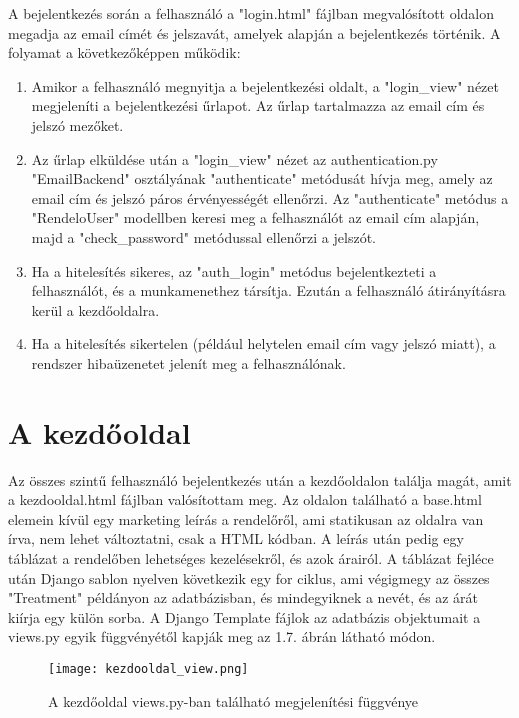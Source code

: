A bejelentkezés során a felhasználó a "login.html" fájlban megvalósított oldalon megadja az email címét és jelszavát, amelyek alapján a bejelentkezés történik. A folyamat a következőképpen működik:

\begin{enumerate}
	\item Amikor a felhasználó megnyitja a bejelentkezési oldalt, a "login\_view" nézet megjeleníti a bejelentkezési űrlapot. Az űrlap tartalmazza az email cím és jelszó mezőket.
	\item Az űrlap elküldése után a "login\_view" nézet az authentication.py "EmailBackend" osztályának "authenticate" metódusát hívja meg, amely az email cím és jelszó páros érvényességét ellenőrzi. Az "authenticate" metódus a "RendeloUser" modellben keresi meg a felhasználót az email cím alapján, majd a "check\_password" metódussal ellenőrzi a jelszót.
	\item Ha a hitelesítés sikeres, az "auth\_login" metódus bejelentkezteti a felhasználót, és a munkamenethez társítja. Ezután a felhasználó átirányításra kerül a kezdőoldalra.
	\item Ha a hitelesítés sikertelen (például helytelen email cím vagy jelszó miatt), a rendszer hibaüzenetet jelenít meg a felhasználónak.
\end{enumerate}

\section{A kezdőoldal}

Az összes szintű felhasználó bejelentkezés után a kezdőoldalon találja magát, amit a kezdooldal.html fájlban valósítottam meg. Az oldalon található a base.html elemein kívül egy marketing leírás a rendelőről, ami statikusan az oldalra van írva, nem lehet változtatni, csak a HTML kódban.
A leírás után pedig egy táblázat a rendelőben lehetséges kezelésekről, és azok árairól. A táblázat fejléce után Django sablon nyelven következik egy for ciklus, ami végigmegy az összes "Treatment" példányon az adatbázisban, és mindegyiknek a nevét, és az árát kiírja egy külön sorba. A Django Template fájlok az adatbázis objektumait a views.py egyik függvényétől kapják meg az 1.7. ábrán látható módon.

\begin{figure}[!htbp]
	\caption{A kezdőoldal views.py-ban található megjelenítési függvénye}
	\label{fig:kezdooldal}
	\centering
	\texttt{[image: kezdooldal\_view.png]}
\end{figure}

